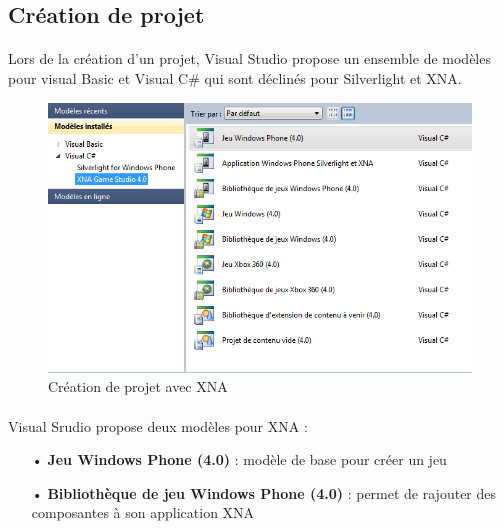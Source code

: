 \documentclass[twoside,UTF8]{EPURapport}
\begin{document}
		\subsection{Création de projet}
\paragraph{}
Lors de la création d'un projet, Visual Studio propose un ensemble de modèles pour visual Basic et Visual C$\#$ qui sont déclinés pour Silverlight et XNA.

	\begin{figure}[H]
		\center
		\includegraphics[scale=0.6]{images/creaprojetxna.png}
		\caption{Création de projet avec XNA}
	\end{figure}		

\paragraph{}
Visual Srudio propose deux modèles pour XNA : 
\begin{itemize}
	\item[•]\textbf{Jeu Windows Phone (4.0)} : modèle de base pour créer un jeu
	\item[•]\textbf{Bibliothèque de jeu Windows Phone (4.0)} : permet de rajouter des composantes à son application XNA
\end{itemize}
	
\end{document}
